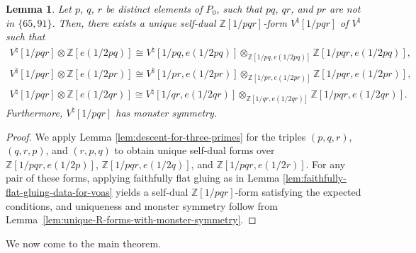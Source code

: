 \documentclass[11pt]{article}
\newcommand{\bZ}{\mathbb{Z}}
\newtheorem{lem}[thm]{Lemma}
\theoremstyle{definition}
\begin{document}
\begin{lem} \label{lem:descent-for-triangle}Let $p$, $q$, $r$ be distinct elements of $P_0$, such that $pq$, $qr$, and $pr$ are not in $\{65, 91 \}$. Then, there exists a unique self-dual $\bZ[1/pqr]$-form $V^\natural[1/pqr]$ of $V^\natural$ such that
 \begin{gather*}
V^\natural[1/pqr] \otimes \bZ[e(1/2pq)] \cong V^\natural[1/pq, e(1/2pq)] \otimes_{\bZ[1/pq, e(1/2pq)]} \bZ[1/pqr, e(1/2pq)], \\
V^\natural[1/pqr] \otimes \bZ[e(1/2pr)]\cong V^\natural[1/pr, e(1/2pr)] \otimes_{\bZ[1/pr, e(1/2pr)]} \bZ[1/pqr, e(1/2pr)], \\
V^\natural[1/pqr] \otimes \bZ[e(1/2qr)]\cong V^\natural[1/qr, e(1/2qr)] \otimes_{\bZ[1/qr, e(1/2qr)]} \bZ[1/pqr, e(1/2qr)].
\end{gather*}
Furthermore, $V^\natural[1/pqr]$ has monster symmetry.
\end{lem}
\begin{proof}We apply Lemma \ref{lem:descent-for-three-primes} for the triples $(p,q,r)$, $(q,r,p)$, and $(r,p,q)$ to obtain unique self-dual forms over $\bZ[1/pqr, e(1/2p)]$, $\bZ[1/pqr, e(1/2q)]$, and $\bZ[1/pqr, e(1/2r)]$. For any pair of these forms, applying faithfully flat gluing as in Lemma \ref{lem:faithfully-flat-gluing-data-for-voas} yields a self-dual $\bZ[1/pqr]$-form satisfying the expected conditions, and uniqueness and monster symmetry follow from Lemma~\ref{lem:unique-R-forms-with-monster-symmetry}.
\end{proof}

We now come to the main theorem.
\end{document}

